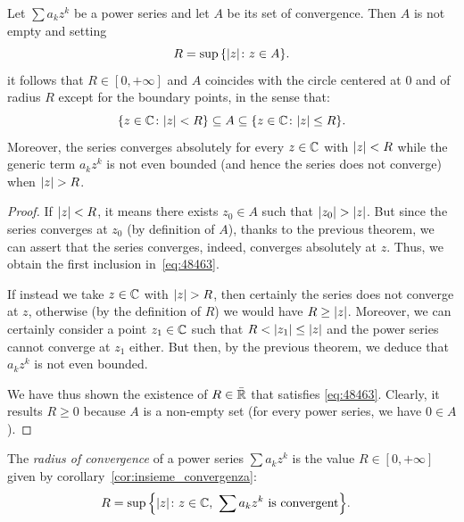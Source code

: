 \begin{corollary}%
\mymark{**}
\label{cor:insieme_convergenza}%
Let $\sum a_k z^k$ be a power series and let $A$ be its set of convergence.
Then $A$ is not empty and setting
\[
  R= \sup {\left\{ {\left|z\right|}\colon z\in A \right\}}.
\]
it follows that $R\in[0,+\infty]$ and $A$ coincides with the circle centered at
$0$
and of radius $R$ except for the boundary points, in the sense that:
\begin{equation}\label{eq:48463}
   {\left\{ z\in {\mathbb C}\colon {\left|z\right|} < R \right\}}
   \subseteq A
   \subseteq {\left\{ z\in {\mathbb C}\colon {\left|z\right|}\le R \right\}}.
\end{equation}
Moreover, the series converges absolutely for every $z\in {\mathbb C}$ with ${\left|z\right|}<R$
while
the generic term $a_k z^k$ is not even bounded (and hence the series does not
converge)
when ${\left|z\right|}>R$.
\end{corollary}
%
\begin{proof}
If ${\left|z\right|}<R$, it means there exists $z_0\in A$ such that ${\left|z_0\right|} >
{\left|z\right|}$.
But since the series converges at $z_0$ (by definition of $A$), thanks to the
previous theorem, we can assert that the series converges, indeed, converges
absolutely
at $z$. Thus, we obtain the first inclusion in~\eqref{eq:48463}.

If instead we take $z\in {\mathbb C}$ with ${\left|z\right|}>R$, then
certainly the series does not converge at $z$, otherwise (by the definition of
$R$)
we would have $R\ge {\left|z\right|}$.
Moreover, we can certainly consider a point $z_1\in{\mathbb C}$
such that $R < {\left|z_1\right|} \le {\left|z\right|}$ and the power series cannot converge at
$z_1$ either.
But then, by the previous theorem,
we deduce that $a_k z^k$ is not even bounded.

We have thus shown the existence of $R\in \bar {{\mathbb R}}$ that satisfies
\eqref{eq:48463}.
Clearly, it results $R\ge 0$ because $A$ is a non-empty set
(for every power series, we have $0\in A$).
\end{proof}

\begin{definition}
\mymark{**}
The \emph{radius of convergence}%
%
 of a power series $\sum a_k z^k$
is the value $R\in[0,+\infty]$
given by corollary~\ref{cor:insieme_convergenza}:
\begin{align*}
    R &= \sup {\left\{ {\left|z\right|}\colon z\in {\mathbb C},\ \sum a_k z^k \text{ is
  convergent} \right\}}.
\end{align*}
\end{definition}

